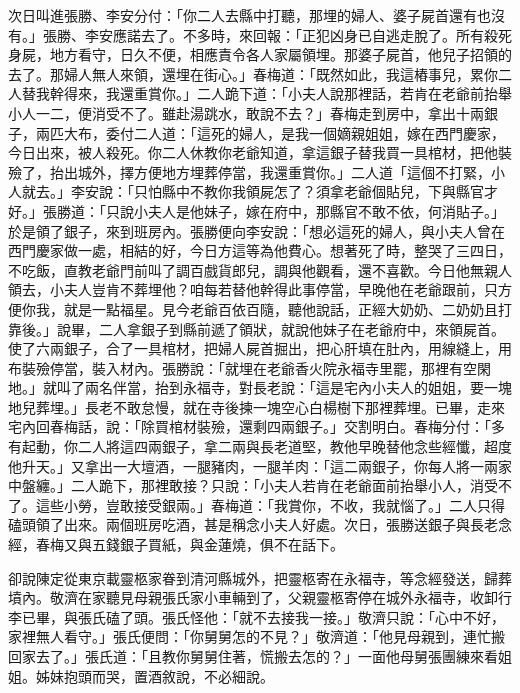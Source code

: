 次日叫進張勝、李安分付：「你二人去縣中打聽，那埋的婦人、婆子屍首還有也沒有。」張勝、李安應諾去了。不多時，來回報：「正犯凶身已自逃走脫了。所有殺死身屍，地方看守，日久不便，相應責令各人家屬領埋。那婆子屍首，他兒子招領的去了。那婦人無人來領，還埋在街心。」春梅道：「既然如此，我這樁事兒，累你二人替我幹得來，我還重賞你。」二人跪下道：「小夫人說那裡話，若肯在老爺前抬舉小人一二，便消受不了。雖赴湯跳水，敢說不去？」春梅走到房中，拿出十兩銀子，兩匹大布，委付二人道：「這死的婦人，是我一個嫡親姐姐，嫁在西門慶家，今日出來，被人殺死。你二人休教你老爺知道，拿這銀子替我買一具棺材，把他裝殮了，抬出城外，擇方便地方埋葬停當，我還重賞你。」二人道「這個不打緊，小人就去。」李安說：「只怕縣中不教你我領屍怎了？須拿老爺個貼兒，下與縣官才好。」張勝道：「只說小夫人是他妹子，嫁在府中，那縣官不敢不依，何消貼子。」於是領了銀子，來到班房內。張勝便向李安說：「想必這死的婦人，與小夫人曾在西門慶家做一處，相結的好，今日方這等為他費心。想著死了時，整哭了三四日，不吃飯，直教老爺門前叫了調百戲貨郎兒，調與他觀看，還不喜歡。今日他無親人領去，小夫人豈肯不葬埋他？咱每若替他幹得此事停當，早晚他在老爺跟前，只方便你我，就是一點福星。見今老爺百依百隨，聽他說話，正經大奶奶、二奶奶且打靠後。」說畢，二人拿銀子到縣前遞了領狀，就說他妹子在老爺府中，來領屍首。使了六兩銀子，合了一具棺材，把婦人屍首掘出，把心肝填在肚內，用線縫上，用布裝殮停當，裝入材內。張勝說：「就埋在老爺香火院永福寺里罷，那裡有空閑地。」就叫了兩名伴當，抬到永福寺，對長老說：「這是宅內小夫人的姐姐，要一塊地兒葬埋。」長老不敢怠慢，就在寺後揀一塊空心白楊樹下那裡葬埋。已畢，走來宅內回春梅話，說：「除買棺材裝殮，還剩四兩銀子。」交割明白。春梅分付：「多有起動，你二人將這四兩銀子，拿二兩與長老道堅，教他早晚替他念些經懺，超度他升天。」又拿出一大壇酒，一腿豬肉，一腿羊肉：「這二兩銀子，你每人將一兩家中盤纏。」二人跪下，那裡敢接？只說：「小夫人若肯在老爺面前抬舉小人，消受不了。這些小勞，豈敢接受銀兩。」春梅道：「我賞你，不收，我就惱了。」二人只得磕頭領了出來。兩個班房吃酒，甚是稱念小夫人好處。次日，張勝送銀子與長老念經，春梅又與五錢銀子買紙，與金蓮燒，俱不在話下。

卻說陳定從東京載靈柩家眷到清河縣城外，把靈柩寄在永福寺，等念經發送，歸葬墳內。敬濟在家聽見母親張氏家小車輛到了，父親靈柩寄停在城外永福寺，收卸行李已畢，與張氏磕了頭。張氏怪他：「就不去接我一接。」敬濟只說：「心中不好，家裡無人看守。」張氏便問：「你舅舅怎的不見？」敬濟道：「他見母親到，連忙搬回家去了。」張氏道：「且教你舅舅住著，慌搬去怎的？」一面他母舅張團練來看姐姐。姊妹抱頭而哭，置酒敘說，不必細說。

